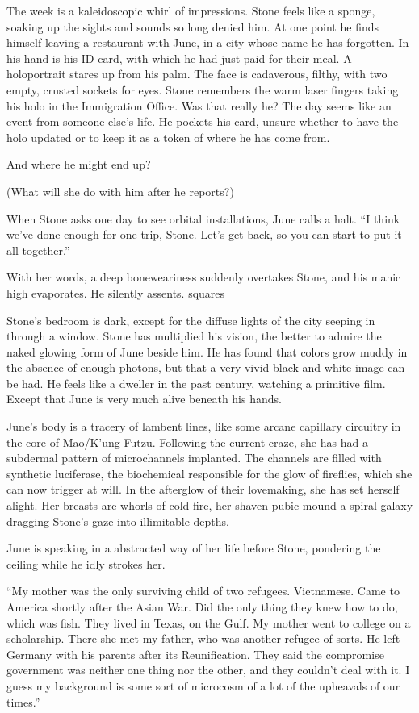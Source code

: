 The week is a kaleidoscopic whirl of impressions. Stone feels like a sponge, soaking up the sights and sounds so long denied him. At one point he finds himself leaving a restaurant with June, in a city whose name he has forgotten. In his hand is his ID card, with which he had just paid for their meal. A holoportrait stares up from his palm. The face is cadaverous, filthy, with two empty, crusted sockets for eyes. Stone remembers the warm laser fingers taking his holo in the Immigration Office. Was that really he? The day seems like an event from someone else’s life. He pockets his card, unsure whether to have the holo updated or to keep it as a token of where he has come from.

And where he might end up?

(What will she do with him after he reports?)

When Stone asks one day to see orbital installations, June calls a halt. “I think we’ve done enough for one trip, Stone. Let’s get back, so you can start to put it all together.”

With her words, a deep boneweariness suddenly overtakes Stone, and his manic high evaporates. He silently assents.
squares

Stone’s bedroom is dark, except for the diffuse lights of the city seeping in through a window. Stone has multiplied his vision, the better to admire the naked glowing form of June beside him. He has found that colors grow muddy in the absence of enough photons, but that a very vivid black-and white image can be had. He feels like a dweller in the past century, watching a primitive film. Except that June is very much alive beneath his hands.

June’s body is a tracery of lambent lines, like some arcane capillary circuitry in the core of Mao/K’ung Futzu. Following the current craze, she has had a subdermal pattern of microchannels implanted. The channels are filled with synthetic luciferase, the biochemical responsible for the glow of fireflies, which she can now trigger at will. In the afterglow of their lovemaking, she has set herself alight. Her breasts are whorls of cold fire, her shaven pubic mound a spiral galaxy dragging Stone’s gaze into illimitable depths.

June is speaking in a abstracted way of her life before Stone, pondering the ceiling while he idly strokes her.

“My mother was the only surviving child of two refugees. Vietnamese. Came to America shortly after the Asian War. Did the only thing they knew how to do, which was fish. They lived in Texas, on the Gulf. My mother went to college on a scholarship. There she met my father, who was another refugee of sorts. He left Germany with his parents after its Reunification. They said the compromise government was neither one thing nor the other, and they couldn’t deal with it. I guess my background is some sort of microcosm of a lot of the upheavals of our times.”

